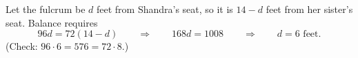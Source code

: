 Let the fulcrum be $d$ feet from Shandra's seat, so it is $14-d$ feet from her sister's seat. Balance requires
\[
96d=72(14-d)\qquad\Longrightarrow\qquad 168d=1008\qquad\Longrightarrow\qquad d=\boxed{6}\text{ feet}.
\]
(Check: $96\cdot6=576=72\cdot8$.)

